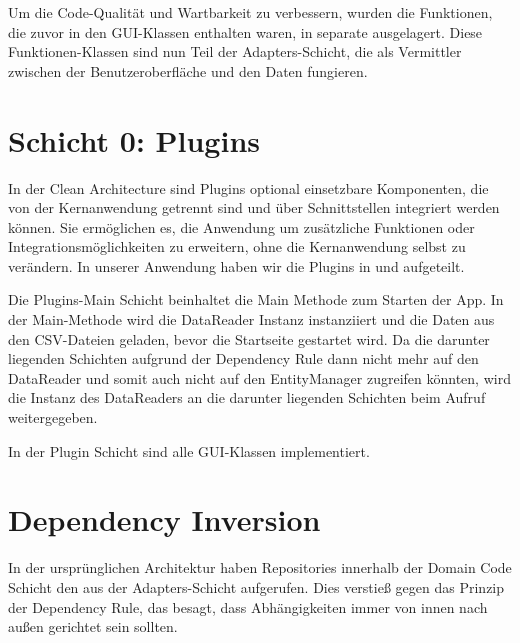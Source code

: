 Um die Code-Qualität und Wartbarkeit zu verbessern, wurden die Funktionen, die zuvor in den GUI-Klassen enthalten waren, in separate \href{https://github.com/MichaelaHaag/RezeptApp/tree/main/1-Adapter/src/main/java/de/rezeptapp/adapter/GUIFunktionen}{} ausgelagert. Diese Funktionen-Klassen sind nun Teil der Adapters-Schicht, die als Vermittler zwischen der Benutzeroberfläche und den Daten fungieren.


\section{Schicht 0: Plugins}
In der Clean Architecture sind Plugins optional einsetzbare Komponenten, die von der Kernanwendung getrennt sind und über Schnittstellen integriert werden können. Sie ermöglichen es, die Anwendung um zusätzliche Funktionen oder Integrationsmöglichkeiten zu erweitern, ohne die Kernanwendung selbst zu verändern. In unserer Anwendung haben wir die Plugins in \href{https://github.com/MichaelaHaag/RezeptApp/tree/main/0-Plugins}{} und \href{https://github.com/MichaelaHaag/RezeptApp/tree/main/0-Plugins-Main}{} aufgeteilt.


Die Plugins-Main Schicht beinhaltet die Main Methode zum Starten der App. In der Main-Methode wird die DataReader Instanz instanziiert und die Daten aus den CSV-Dateien geladen, bevor die Startseite gestartet wird. Da die darunter liegenden Schichten aufgrund der Dependency Rule dann nicht mehr auf den DataReader und somit auch nicht auf den EntityManager zugreifen könnten, wird die Instanz des DataReaders an die darunter liegenden Schichten beim Aufruf weitergegeben.

In der Plugin Schicht sind alle GUI-Klassen implementiert.


\section{Dependency Inversion}
\label{DI}
In der ursprünglichen Architektur haben Repositories innerhalb der Domain Code Schicht den  aus der Adapters-Schicht aufgerufen. Dies verstieß gegen das Prinzip der Dependency Rule, das besagt, dass Abhängigkeiten immer von innen nach außen gerichtet sein sollten.

